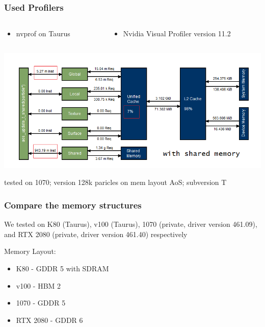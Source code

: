\documentclass[aspectratio=169]{beamer}
\begin{document}
\begin{frame}
	\frametitle{Used Profilers}
	\begin{columns}
	\begin{column}{0.3\textwidth}
		\begin{itemize}
			\small \item nvprof on Taurus
		\end{itemize}
	\end{column}
	
	\begin{column}{0.5\textwidth}
		\begin{itemize}
			\small \item Nvidia Visual Profiler version 11.2
		\end{itemize}
	\end{column}
	\end{columns}
	\smallskip
	\includegraphics[scale=0.50]{resources/128-1070-aos-update-t-shared.png}
	
	\smallskip
	\small tested on 1070; version 128k paricles on mem layout AoS; subversion T
\end{frame}

\begin{frame}
	\frametitle{Compare the memory structures}
	We tested on K80 (Taurus), v100 (Taurus), 1070 (private, driver version 461.09), and RTX 2080 (private, driver version 461.40) respectively
	
	\medskip
	Memory Layout:
	\begin{itemize}
		\item K80 - GDDR 5 with SDRAM
		\item v100 - HBM 2
		\item 1070 - GDDR 5
		\item RTX 2080 - GDDR 6
	\end{itemize}
\end{frame}
\end{document}
